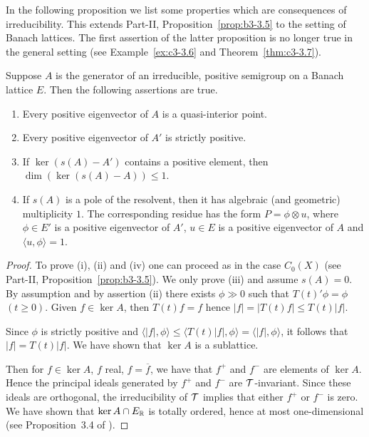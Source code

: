 In the following proposition we list some properties which are consequences of irreducibility. 
This extends Part-II, Proposition~\ref{prop:b3-3.5} to the setting of Banach lattices. 
The first assertion of the latter proposition is no longer true in the general setting (see Example~\ref{ex:c3-3.6} and Theorem~\ref{thm:c3-3.7}). 
\begin{proposition}\label{prop:c3-3.5}
	
	Suppose $A$ is the generator of an irreducible, positive semigroup on a Banach lattice $E$.
	Then the following assertions are true.
	\begin{enumerate}[\upshape (i)]
	\item 
	Every positive eigenvector of\/ $A$ is a quasi-interior point.
	
	\item 
	Every positive eigenvector of\/ $A'$ is strictly positive.
	
	\item 
	If $\ker(s(A) - A')$ contains a positive element, then $\dim(\ker(s(A) - A)) \leq 1$.
	
	\item If\/ $s(A)$ is a pole of the resolvent, then it has algebraic (and geometric) multiplicity $1$.
	The corresponding residue has the form $P = \phi\otimes u$, where $\phi \in E'$ is a positive eigenvector of\/ $A'$, $u \in E$ is a positive eigenvector of\/ $A$ and $\langle u,\phi \rangle = 1$.
	\end{enumerate}
\end{proposition}
\begin{proof}
    To prove (i), (ii) and (iv) one can proceed as in the case $C_{0}(X)$ (see Part-II, Proposition~\ref{prop:b3-3.5}).
    We only prove (iii) and assume $s(A) = 0$.
    By assumption and by assertion (ii) there exists $\phi \gg 0$ such that $T(t)'\phi = \phi$ $(t\geq0)$.
    Given $f \in \ker A$, then $T(t)f = f$ hence $|f| = |T(t)f| \leq T(t)|f|$.
    
    Since $\phi$ is strictly positive and $\langle|f|,\phi\rangle \leq \langle T(t)|f|,\phi\rangle = \langle|f|,\phi\rangle$, it follows that $|f| = T(t)|f|$.
    We have shown that $\ker A$ is a sublattice.
    
    Then for $f \in \ker A$, $f$ real, \ie  $f = \overline{f}$, we have that $f^{+}$ and $f^{-}$ are elements of\/ $\ker A$.
    Hence the principal ideals generated by $f^{+}$ and $f^{-}$ are $\mathcal{T}$-invariant.
    Since these ideals are orthogonal, the irreducibility of\/ $\mathcal{T}$ implies that either $f^{+}$ or $f^{-}$ is zero.
    We have shown that $\ker A \cap E_{\mathbb{R} }$ is totally ordered, hence at most one-dimensional (see Proposition~3.4 of \textcite{schaefer:1974}).
\end{proof}
